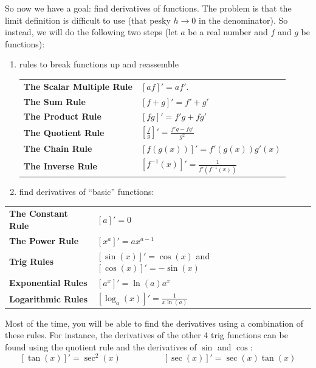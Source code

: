 \documentclass{article}
\theoremstyle{definition}
\theoremstyle{definition}
\begin{document}
So now we have a goal: find derivatives of functions. The problem is that the limit definition is difficult to use (that pesky $h\to 0$ in the denominator). So instead, we will do the following two steps (let $a$ be a real number and $f$ and $g$ be functions):
\begin{enumerate}
\item rules to break functions up and reassemble

\begin{center}
\def\arraystretch{1.5}
\begin{tabular}{@{}ll@{}}
\toprule[0.4mm]
\textbf{The Scalar Multiple Rule} & $[af]' = af'$. \\
\textbf{The Sum Rule} & $[f + g]' = f' + g'$ \\
\textbf{The Product Rule} & $[fg]' = f'g + fg'$ \\
\textbf{The Quotient Rule} & $\left[\frac{f}{g}\right]' = \frac{f'g - fg'}{g^2}$ \\
\textbf{The Chain Rule} & $[f(g(x))]' = f'(g(x))g'(x)$ \\
\textbf{The Inverse Rule} & $[f^{-1}(x)]' = \frac{1}{f'(f^{-1}(x))}$ \\
\bottomrule[0.4mm]
\end{tabular}
\end{center}

\item find derivatives of ``basic'' functions:

\end{enumerate}


\begin{center}
\def\arraystretch{1.5}
\begin{tabular}{@{}ll@{}}
\toprule[0.4mm]
\textbf{The Constant Rule}     & $[a]' = 0$ \\
\textbf{The Power Rule}        & $[x^a]' = ax^{a-1}$ \\
\textbf{Trig Rules}  & $[\sin(x)]' = \cos(x)$ and $[\cos(x)]' = -\sin(x)$ \\
\textbf{Exponential Rules} & $[a^x]' = \ln(a)a^x$ \\
\textbf{Logarithmic Rules} & $[\log_a(x)]' = \frac{1}{x\ln(a)}$ \\
\bottomrule[0.4mm]
\end{tabular}
\end{center}


Most of the time, you will be able to find the derivatives using a combination of these rules. For instance, the derivatives of the other 4 trig functions can be found using the quotient rule and the derivatives of $\sin$ and $\cos$:
$$[\tan(x)]' = \sec^2(x)
\quad\quad\quad\quad\quad
[\sec(x)]' = \sec(x)\tan(x)$$
\end{document}
